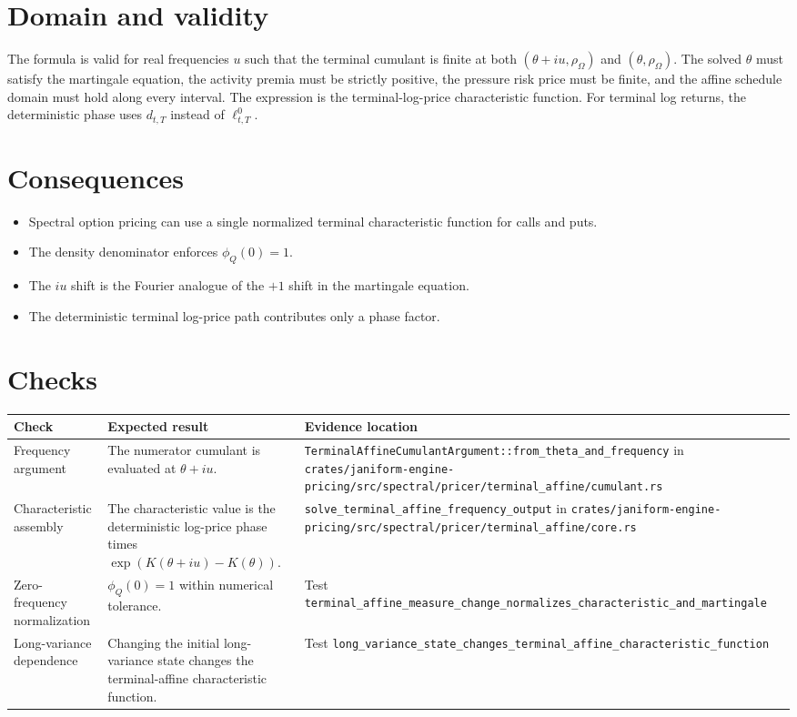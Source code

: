 \documentclass[11pt]{article}
\begin{document}
\section{Domain and validity}

The formula is valid for real frequencies \(u\) such that the terminal
cumulant is finite at both \((\theta+iu,\rho_\Omega)\) and
\((\theta,\rho_\Omega)\).
The solved \(\theta\) must satisfy the martingale equation, the activity premia
must be strictly positive, the pressure risk price must be finite, and the
affine schedule domain must hold along every interval.
The expression is the terminal-log-price characteristic function.
For terminal log returns, the deterministic phase uses \(d_{t,T}\) instead of
\(\ell_{t,T}^{0}\).

\section{Consequences}

\begin{itemize}
    \item Spectral option pricing can use a single normalized terminal characteristic function for calls and puts.
    \item The density denominator enforces \(\phi_Q(0)=1\).
    \item The \(iu\) shift is the Fourier analogue of the \(+1\) shift in the martingale equation.
    \item The deterministic terminal log-price path contributes only a phase factor.
\end{itemize}

\section{Checks}

\begin{tabularx}{\textwidth}{XXX}
\toprule
Check & Expected result & Evidence location\\
\midrule
Frequency argument
& The numerator cumulant is evaluated at \(\theta+iu\).
& \texttt{TerminalAffineCumulantArgument::from\_theta\_and\_frequency} in \texttt{crates/janiform-engine-pricing/src/spectral/pricer/terminal\_affine/cumulant.rs}\\
Characteristic assembly
& The characteristic value is the deterministic log-price phase times \(\exp(K(\theta+iu)-K(\theta))\).
& \texttt{solve\_terminal\_affine\_frequency\_output} in \texttt{crates/janiform-engine-pricing/src/spectral/pricer/terminal\_affine/core.rs}\\
Zero-frequency normalization
& \(\phi_Q(0)=1\) within numerical tolerance.
& Test \texttt{terminal\_affine\_measure\_change\_normalizes\_characteristic\_and\_martingale}\\
Long-variance dependence
& Changing the initial long-variance state changes the terminal-affine characteristic function.
& Test \texttt{long\_variance\_state\_changes\_terminal\_affine\_characteristic\_function}\\
\bottomrule
\end{tabularx}
\end{document}
